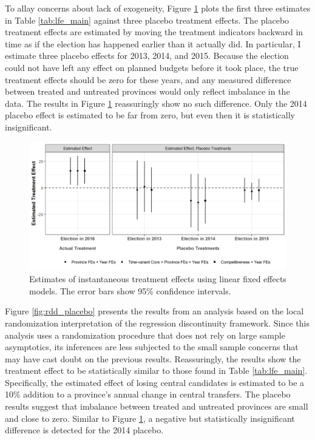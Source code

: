 \documentclass[12pt]{article}
\newcommand{\1}{\mathbbm{1}}
\begin{document}
To allay concerns about lack of exogeneity, Figure \ref{fig:lfe_placebo} plots the first three estimates in Table \ref{tab:lfe_main} against three placebo treatment effects. The placebo treatment effects are estimated by moving the treatment indicators backward in time as if the election has happened earlier than it actually did. In particular, I estimate three placebo effects for 2013, 2014, and 2015. Because the election could not have left any effect on planned budgets before it took place, the true treatment effects should be zero for these years, and any measured difference between treated and untreated provinces would only reflect imbalance in the data. The results in Figure \ref{fig:lfe_placebo} reassuringly show no such difference. Only the 2014 placebo effect is estimated to be far from zero, but even then it is statistically insignificant.

\begin{figure}[!htbp]
	\centering
	\includegraphics[width=\textwidth]{figure/190618_lfe_placebo.png}
	\captionsetup{singlelinecheck=off}
	\caption[Estimated placebo linear fixed effects treatment effects]{Estimates of instantaneous treatment effects using linear fixed effects models. The error bars show 95\% confidence intervals.}
	\label{fig:lfe_placebo}
\end{figure}

Figure \ref{fig:rdd_placebo} presents the results from an analysis based on the local randomization interpretation of the regression discontinuity framework. Since this analysis uses a randomization procedure that does not rely on large sample asymptotics, its inferences are less subjected to the small sample concerns that may have cast doubt on the previous results. Reassuringly, the results show the treatment effect to be statistically similar to those found in Table \ref{tab:lfe_main}. Specifically, the estimated effect of losing central candidates is estimated to be a 10\% addition to a province's annual change in central transfers. The placebo results suggest that imbalance between treated and untreated provinces are small and close to zero. Similar to Figure \ref{fig:lfe_placebo}, a negative but statistically insignificant difference is detected for the 2014 placebo. 
\end{document}
